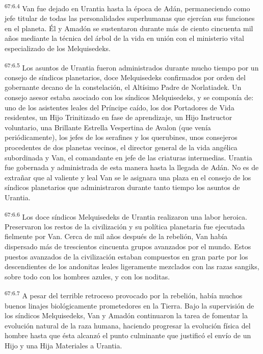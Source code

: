 \par
\textsuperscript{67:6.4} Van fue dejado en Urantia hasta la época de Adán, permaneciendo como jefe titular de todas las personalidades superhumanas que ejercían sus funciones en el planeta. Él y Amadón se sustentaron durante más de ciento cincuenta mil años mediante la técnica del árbol de la vida en unión con el ministerio vital especializado de los Melquisedeks.

\par
\textsuperscript{67:6.5} Los asuntos de Urantia fueron administrados durante mucho tiempo por un consejo de síndicos planetarios, doce Melquisedeks confirmados por orden del gobernante decano de la constelación, el Altísimo Padre de Norlatiadek. Un consejo asesor estaba asociado con los síndicos Melquisedeks, y se componía de: uno de los asistentes leales del Príncipe caído, los dos Portadores de Vida residentes, un Hijo Trinitizado en fase de aprendizaje, un Hijo Instructor voluntario, una Brillante Estrella Vespertina de Avalon (que venía periódicamente), los jefes de los serafines y los querubines, unos consejeros procedentes de dos planetas vecinos, el director general de la vida angélica subordinada y Van, el comandante en jefe de las criaturas intermedias. Urantia fue gobernada y administrada de esta manera hasta la llegada de Adán. No es de extrañar que al valiente y leal Van se le asignara una plaza en el consejo de los síndicos planetarios que administraron durante tanto tiempo los asuntos de Urantia.

\par
\textsuperscript{67:6.6} Los doce síndicos Melquisedeks de Urantia realizaron una labor heroica. Preservaron los restos de la civilización y su política planetaria fue ejecutada fielmente por Van. Cerca de mil años después de la rebelión, Van había dispersado más de trescientos cincuenta grupos avanzados por el mundo. Estos puestos avanzados de la civilización estaban compuestos en gran parte por los descendientes de los andonitas leales ligeramente mezclados con las razas sangiks, sobre todo con los hombres azules, y con los noditas.

\par
\textsuperscript{67:6.7} A pesar del terrible retroceso provocado por la rebelión, había muchos buenos linajes biológicamente prometedores en la Tierra. Bajo la supervisión de los síndicos Melquisedeks, Van y Amadón continuaron la tarea de fomentar la evolución natural de la raza humana, haciendo progresar la evolución física del hombre hasta que ésta alcanzó el punto culminante que justificó el envío de un Hijo y una Hija Materiales a Urantia.


